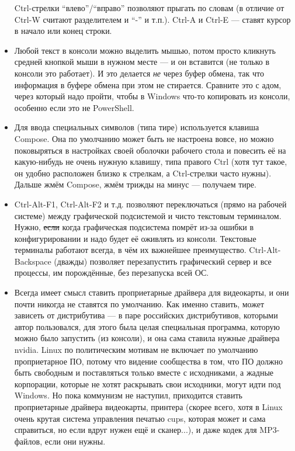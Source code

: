 \documentclass{../../text-style}
\begin{document}
\begin{itemize}
        Ctrl-стрелки \enquote{влево}/\enquote{вправо} позволяют прыгать по словам (в отличие от Ctrl-W считают разделителем и \enquote{-} и т.п.).
        Ctrl-A и Ctrl-E --- ставят курсор в начало или конец строки.
    \item Любой текст в консоли можно выделить мышью, потом просто кликнуть средней кнопкой мыши в нужном месте --- и он вставится (не только в консоли это работает).
        И это делается \emph{не} через буфер обмена, так что информация в буфере обмена при этом не стирается.
        Сравните это с адом, через который надо пройти, чтобы в Windows что-то копировать из консоли, особенно если это не PowerShell.
    \item Для ввода специальных символов (типа тире) используется клавиша Compose.
        Она по умолчанию может быть не настроена вовсе, но можно поковыряться в настройках своей оболочки рабочего стола и повесить её на какую-нибудь не очень нужную клавишу, типа правого Ctrl (хотя тут такое, он удобно расположен близко к стрелкам, а Ctrl-стрелки часто нужны).
        Дальше жмём Compose, жмём трижды на минус --- получаем тире.
    \item Ctrl-Alt-F1, Ctrl-Alt-F2 и т.д. позволяют переключаться (прямо на рабочей системе) между графической подсистемой и чисто текстовым терминалом.
        Нужно, \sout{если} когда графическая подсистема помрёт из-за ошибки в конфигурировании и надо будет её оживлять из консоли.
        Текстовые терминалы работают всегда, в чём их важнейшее преимущество.
        Ctrl-Alt-Backspace (дважды) позволяет перезапустить графический сервер и все процессы, им порождённые, без перезапуска всей ОС.
    \item Всегда имеет смысл ставить проприетарные драйвера для видеокарты, и они почти никогда не ставятся по умолчанию.
        Как именно ставить, может зависеть от дистрибутива --- в паре российских дистрибутивов, которыми автор пользовался, для этого была целая специальная программа, которую можно было запустить (из консоли), и она сама ставила нужные драйвера nvidia.
        Linux по политическим мотивам не включает по умолчанию проприетарное ПО, потому что видение сообщества в том, что ПО должно быть свободным и поставляться только вместе с исходниками, а жадные корпорации, которые не хотят раскрывать свои исходники, могут идти под Windows.
        Но пока коммунизм не наступил, приходится ставить проприетарные драйвера видеокарты, принтера (скорее всего, хотя в Linux очень крутая система управления печатью cups, которая может и сама справиться, но если вдруг нужен ещё и сканер...), и даже кодек для MP3-файлов, если они нужны.
\end{itemize}
\end{document}
